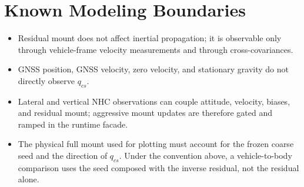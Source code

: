 \documentclass[11pt]{article}
\begin{document}
\section{Known Modeling Boundaries}

\begin{itemize}[leftmargin=1.5em]
\item Residual mount does not affect inertial propagation; it is observable only
through vehicle-frame velocity measurements and through cross-covariances.
\item GNSS position, GNSS velocity, zero velocity, and stationary gravity do not
directly observe \(q_{cs}\).
\item Lateral and vertical NHC observations can couple attitude, velocity,
biases, and residual mount; aggressive mount updates are therefore gated and
ramped in the runtime facade.
\item The physical full mount used for plotting must account for the frozen
coarse seed and the direction of \(q_{cs}\). Under the convention above, a
vehicle-to-body comparison uses the seed composed with the inverse residual,
not the residual alone.
\end{itemize}
\end{document}
